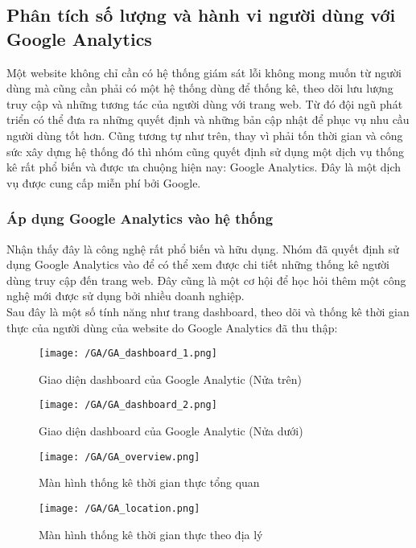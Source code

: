 			 	\subsection{Phân tích số lượng và hành vi người dùng với Google Analytics}
			 	Một website không chỉ cần có hệ thống giám sát lỗi không mong muốn từ người dùng mà cũng cần phải có một hệ thống dùng để thống kê, theo dõi lưu lượng truy cập và những tương tác của người dùng với trang web. Từ đó đội ngũ phát triển có thể đưa ra những quyết định và những bản cập nhật để phục vụ nhu cầu người dùng tốt hơn. Cũng tương tự như trên, thay vì phải tốn thời gian và công sức xây dựng hệ thống đó thì nhóm cũng quyết định sử dụng một dịch vụ thống kê rất phổ biến và được ưa chuộng hiện nay: Google Analytics. Đây là một dịch vụ được cung cấp miễn phí bởi Google.
			 	
			 	\subsubsection{Áp dụng Google Analytics vào hệ thống}
			 	Nhận thấy đây là công nghệ rất phổ biến và hữu dụng. Nhóm đã quyết định sử dụng Google Analytics vào để có thể xem được chi tiết những thống kê người dùng truy cập đến trang web. Đây cũng là một cơ hội để học hỏi thêm một công nghệ mới được sử dụng bởi nhiều doanh nghiệp.\\
			 	
			 	Sau đây là một số tính năng như trang dashboard, theo dõi và thống kê thời gian thực của người dùng của website do Google Analytics đã thu thập:
			 	
			 	\begin{figure}[H]
			 		\texttt{[image: /GA/GA\_dashboard\_1.png]}
			 		\centering
			 		\caption{Giao diện dashboard của Google Analytic (Nửa trên)}
			 	\end{figure}
		 	
		 		\begin{figure}[H]
		 			\texttt{[image: /GA/GA\_dashboard\_2.png]}
		 			\centering
			 		\caption{Giao diện dashboard của Google Analytic (Nửa dưới)}
		 		\end{figure}
			 	
			 	\begin{figure}[H]
			 		\texttt{[image: /GA/GA\_overview.png]}
			 		\centering
			 		\caption{Màn hình thống kê thời gian thực tổng quan}
			 	\end{figure}
			 	
			 	\begin{figure}[H]
			 		\texttt{[image: /GA/GA\_location.png]}
			 		\centering
			 		\caption{Màn hình thống kê thời gian thực theo địa lý}
			 	\end{figure}
			 	

